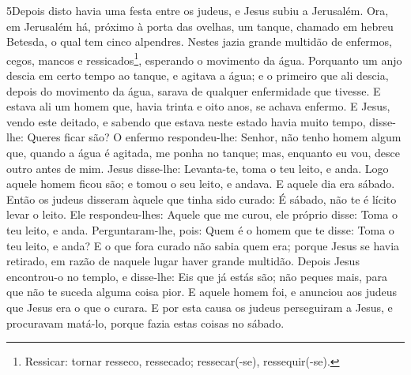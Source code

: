 \medskip

\lettrine{5} Depois disto havia uma festa entre os judeus, e
Jesus subiu a Jerusalém. Ora, em Jerusalém há, próximo à porta
das ovelhas, um tanque, chamado em hebreu Betesda, o qual tem cinco
alpendres. Nestes jazia grande multidão de enfermos, cegos,
mancos e ressicados\footnote{Ressicar: tornar resseco, ressecado;
ressecar(-se), ressequir(-se).}, esperando o movimento da água.
Porquanto um anjo descia em certo tempo ao tanque, e agitava a
água; e o primeiro que ali descia, depois do movimento da água,
sarava de qualquer enfermidade que tivesse. E estava ali um
homem que, havia trinta e oito anos, se achava enfermo. E Jesus,
vendo este deitado, e sabendo que estava neste estado havia muito
tempo, disse-lhe: Queres ficar são? O enfermo respondeu-lhe:
Senhor, não tenho homem algum que, quando a água é agitada, me ponha
no tanque; mas, enquanto eu vou, desce outro antes de mim. Jesus
disse-lhe: Levanta-te, toma o teu leito, e anda. Logo aquele
homem ficou são; e tomou o seu leito, e andava. E aquele dia era
sábado. Então os judeus disseram àquele que tinha sido
curado: É sábado, não te é lícito levar o leito. Ele
respondeu-lhes: Aquele que me curou, ele próprio disse: Toma o teu
leito, e anda. Perguntaram-lhe, pois: Quem é o homem que te
disse: Toma o teu leito, e anda? E o que fora curado não
sabia quem era; porque Jesus se havia retirado, em razão de naquele
lugar haver grande multidão. Depois Jesus encontrou-o no
templo, e disse-lhe: Eis que já estás são; não peques mais, para que
não te suceda alguma coisa pior. E aquele homem foi, e
anunciou aos judeus que Jesus era o que o curara. E por esta
causa os judeus perseguiram a Jesus, e procuravam matá-lo, porque
fazia estas coisas no sábado.

